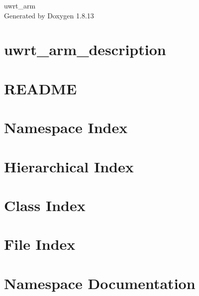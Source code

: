 \documentclass[twoside]{book}
\newcommand{\+}{\discretionary{\mbox{\scriptsize$\hookleftarrow$}}{}{}}
\newcommand{\clearemptydoublepage}{%
  \newpage{\pagestyle{empty}\cleardoublepage}%
}
\begin{document}
\hypersetup{pageanchor=false,
             bookmarksnumbered=true,
             pdfencoding=unicode
            }
\begin{titlepage}
\vspace*{7cm}
\begin{center}%
{\Large uwrt\+\_\+arm }\\
\vspace*{1cm}
{\large Generated by Doxygen 1.8.13}\\
\end{center}
\end{titlepage}
\clearemptydoublepage
{}
\tableofcontents
\clearemptydoublepage
{}
\hypersetup{pageanchor=true}

\chapter{uwrt\+\_\+arm\+\_\+description}
\label{md_uwrt_arm_description__r_e_a_d_m_e}

\chapter{R\+E\+A\+D\+ME}
\label{md_uwrt_arm_hw__r_e_a_d_m_e}

\chapter{Namespace Index}

\chapter{Hierarchical Index}

\chapter{Class Index}

\chapter{File Index}

\chapter{Namespace Documentation}





\end{document}
